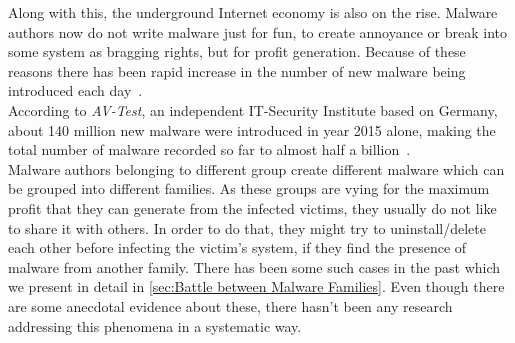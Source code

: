 Along with this, the underground Internet economy is also on the rise.
Malware authors now do not write malware just for fun, to create annoyance or break into some system as bragging rights, but for profit generation.
Because of these reasons there has been rapid increase in the number of new malware being introduced each day~\cite[]{tian}.\\
According to \emph{AV-Test}, an independent IT-Security Institute based on Germany, about 140 million new malware were introduced in year 2015 alone, making the total number of malware recorded so far to almost half a billion~\cite[]{avtest}.\\
Malware authors belonging to different group create different malware which can be grouped into different families.
As these groups are vying for the maximum profit that they can generate from the infected victims, they usually do not like to share it with others.
In order to do that, they might try to uninstall/delete each other before infecting the victim's system, if they find the presence of malware from another family.
There has been some such cases in the past which we present in detail in \autoref{sec:Battle between Malware Families}.
Even though there are some anecdotal evidence about these, there hasn't been any research addressing this phenomena in a systematic way.
